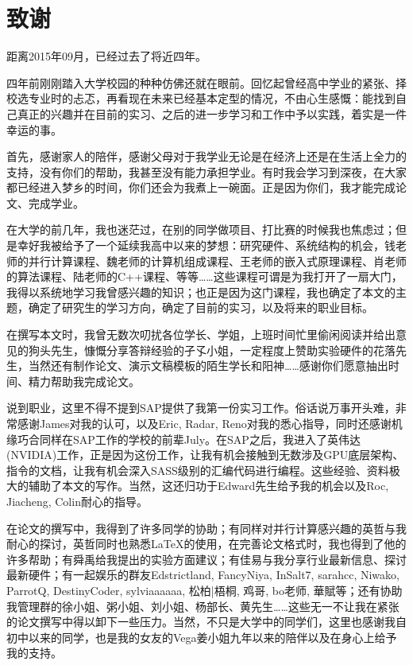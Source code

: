 \clearpage                              %
\section*{致谢}                         %
\par 距离2015年09月，已经过去了将近四年。
\par 四年前刚刚踏入大学校园的种种仿佛还就在眼前。回忆起曾经高中学业的紧张、择校选专业时的忐忑，再看现在未来已经基本定型的情况，不由心生感慨：能找到自己真正的兴趣并在目前的实习、之后的进一步学习和工作中予以实践，着实是一件幸运的事。
\par 首先，感谢家人的陪伴，感谢父母对于我学业无论是在经济上还是在生活上全力的支持，没有你们的帮助，我甚至没有能力承担学业。有时我会学习到深夜，在大家都已经进入梦乡的时间，你们还会为我煮上一碗面。正是因为你们，我才能完成论文、完成学业。
\par 在大学的前几年，我也迷茫过，在别的同学做项目、打比赛的时候我也焦虑过；但是幸好我被给予了一个延续我高中以来的梦想：研究硬件、系统结构的机会，钱老师的并行计算课程、魏老师的计算机组成课程、王老师的嵌入式原理课程、肖老师的算法课程、陆老师的C++课程、等等……这些课程可谓是为我打开了一扇大门，我得以系统地学习我曾感兴趣的知识；也正是因为这门课程，我也确定了本文的主题，确定了研究生的学习方向，确定了目前的实习，以及将来的职业目标。
\par 在撰写本文时，我曾无数次叨扰各位学长、学姐，上班时间忙里偷闲阅读并给出意见的狗头先生，慷慨分享答辩经验的孑孓小姐，一定程度上赞助实验硬件的花落先生，当然还有制作论文、演示文稿模板的陌生学长和阳神……感谢你们愿意抽出时间、精力帮助我完成论文。
\par 说到职业，这里不得不提到SAP提供了我第一份实习工作。俗话说万事开头难，非常感谢James对我的认可，以及Eric, Radar, Reno对我的悉心指导，同时还感谢机缘巧合同样在SAP工作的学校的前辈July。在SAP之后，我进入了英伟达(NVIDIA)工作，正是因为这份工作，让我有机会接触到无数涉及GPU底层架构、指令的文档，让我有机会深入SASS级别的汇编代码进行编程。这些经验、资料极大的辅助了本文的写作。当然，这还归功于Edward先生给予我的机会以及Roc, Jiacheng, Colin耐心的指导。
\par 在论文的撰写中，我得到了许多同学的协助；有同样对并行计算感兴趣的英哲与我耐心的探讨，英哲同时也熟悉\LaTeX 的使用，在完善论文格式时，我也得到了他的许多帮助；有舜禹给我提出的实验方面建议；有佳易与我分享行业最新信息、探讨最新硬件；有一起娱乐的群友Edstrictland, FancyNiya, InSalt7, sarahcc, Niwako, ParrotQ, DestinyCoder, sylviaaaaaa, 松柏|梧桐, 鸡哥, bo老师, 華賦等；还有协助我管理群的徐小姐、粥小姐、刘小姐、杨部长、黄先生……这些无一不让我在紧张的论文撰写中得以卸下一些压力。当然，不只是大学中的同学们，这里也感谢我自初中以来的同学，也是我的女友的Vega姜小姐九年以来的陪伴以及在身心上给予我的支持。
